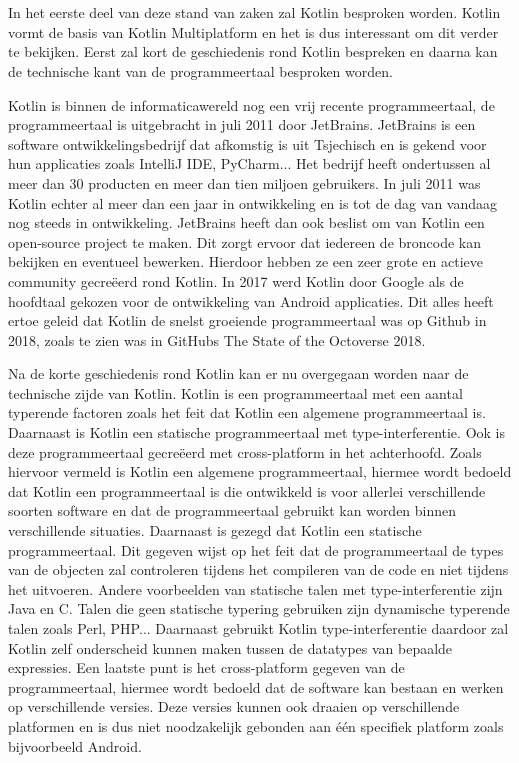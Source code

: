 \section{}
\label{sec:SVZkotlin}

In het eerste deel van deze stand van zaken zal Kotlin besproken worden. Kotlin vormt de basis van Kotlin Multiplatform en het is dus interessant om dit verder te bekijken. Eerst zal kort de geschiedenis rond Kotlin bespreken en daarna kan de technische kant van de programmeertaal besproken worden.

Kotlin is binnen de informaticawereld nog een vrij recente programmeertaal, de programmeertaal is uitgebracht in juli 2011 door JetBrains.\autocite{Jemerov2011} JetBrains is een software ontwikkelingsbedrijf dat afkomstig is uit Tsjechisch en is gekend voor hun applicaties zoals IntelliJ IDE, PyCharm... Het bedrijf heeft ondertussen al meer dan 30 producten en meer dan tien miljoen gebruikers.\autocite{JetBrains2021} In juli 2011 was Kotlin echter al meer dan een jaar in ontwikkeling en is tot de dag van vandaag nog steeds in ontwikkeling. JetBrains heeft dan ook beslist om van Kotlin een open-source project te maken. Dit zorgt ervoor dat iedereen de broncode kan bekijken en eventueel bewerken. Hierdoor hebben ze een zeer grote en actieve community gecreëerd rond Kotlin.  In 2017 werd Kotlin door Google als de hoofdtaal gekozen voor de ontwikkeling van Android applicaties.\autocite{Shafirov2017} Dit alles heeft ertoe geleid dat Kotlin de snelst groeiende programmeertaal was op Github in 2018, zoals te zien was in GitHubs The State of the Octoverse 2018.\autocite{GitHub2018} 


Na de korte geschiedenis rond Kotlin kan er nu overgegaan worden naar de technische zijde van Kotlin. Kotlin is een programmeertaal met een aantal typerende factoren zoals het feit dat Kotlin een algemene programmeertaal is. Daarnaast is Kotlin een statische programmeertaal met type-interferentie. Ook is deze programmeertaal gecreëerd met cross-platform in het achterhoofd.\autocite{Oliveira2020} Zoals hiervoor vermeld is Kotlin een algemene programmeertaal, hiermee wordt bedoeld dat Kotlin een programmeertaal is die ontwikkeld is voor allerlei verschillende soorten software en dat de programmeertaal gebruikt kan worden binnen verschillende situaties.\autocite{Skeen2018} Daarnaast is gezegd dat Kotlin een statische programmeertaal. Dit gegeven wijst op het feit dat de programmeertaal de types van de objecten zal controleren tijdens het compileren van de code en niet tijdens het uitvoeren. Andere voorbeelden van statische talen met type-interferentie zijn Java en C. Talen die geen statische typering gebruiken zijn dynamische typerende talen zoals Perl, PHP... Daarnaast gebruikt Kotlin type-interferentie daardoor zal Kotlin zelf onderscheid kunnen maken tussen de datatypes van bepaalde expressies.\autocite{Meijer2004} Een laatste punt is het cross-platform gegeven van de programmeertaal, hiermee wordt bedoeld dat de software kan bestaan en werken op verschillende versies. Deze versies kunnen ook draaien op verschillende platformen en is dus niet noodzakelijk gebonden aan één specifiek platform zoals bijvoorbeeld Android.\autocite{Bishop2006}



